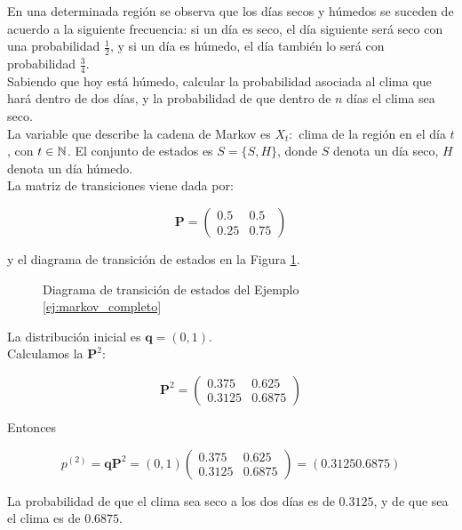 \begin{ejemplo} \label{ej:markov_completo}

En una determinada región se observa que los días secos y húmedos se suceden de acuerdo a la siguiente frecuencia: si un día es seco, el día siguiente será seco con una probabilidad $\frac{1}{2}$, y si un día es húmedo, el día también lo será con probabilidad $\frac{3}{4}$.\\

Sabiendo que hoy está húmedo, calcular la probabilidad asociada al clima que hará dentro de dos días, y la probabilidad de que dentro de $n$ días el clima sea seco. \\

La variable que describe la cadena de Markov es $X_t:$ clima de la región en el día $t$, con $t \in \mathbb{N}$. El conjunto de estados es $S = \{S, H\}$, donde $S$ denota un día seco, $H$ denota un día húmedo.\\

La matriz de transiciones viene dada por:

\[ \mathbf{P} = \left( \begin{array}{cc}
0.5 & 0.5\\
0.25 & 0.75
\end{array} \right) \]

y el diagrama de transición de estados en la Figura \ref{fig:markov_completo}.

\begin{figure}[htb]
\centering
\ejemplomarkovcompleto
\caption{Diagrama de transición de estados del Ejemplo \ref{ej:markov_completo}}
\label{fig:markov_completo}
\end{figure} 

La distribución inicial es $\mathbf{q} = (0, 1)$.\\

Calculamos la $\mathbf{P}^2$:

\[ \mathbf{P}^2 = \left( \begin{array}{cc}
0.375 & 0.625\\
0.3125 & 0.6875
\end{array} \right) \]

Entonces

\[ p^{(2)} = \mathbf{q P}^2 = (0,1) \left( \begin{array}{cc}
0.375 & 0.625\\
0.3125 & 0.6875
\end{array} \right) = (0.3125 0.6875) \]

La probabilidad de que el clima sea seco a los dos días es de $0.3125$, y de que sea el clima es de $0.6875$.\\


\end{ejemplo}
